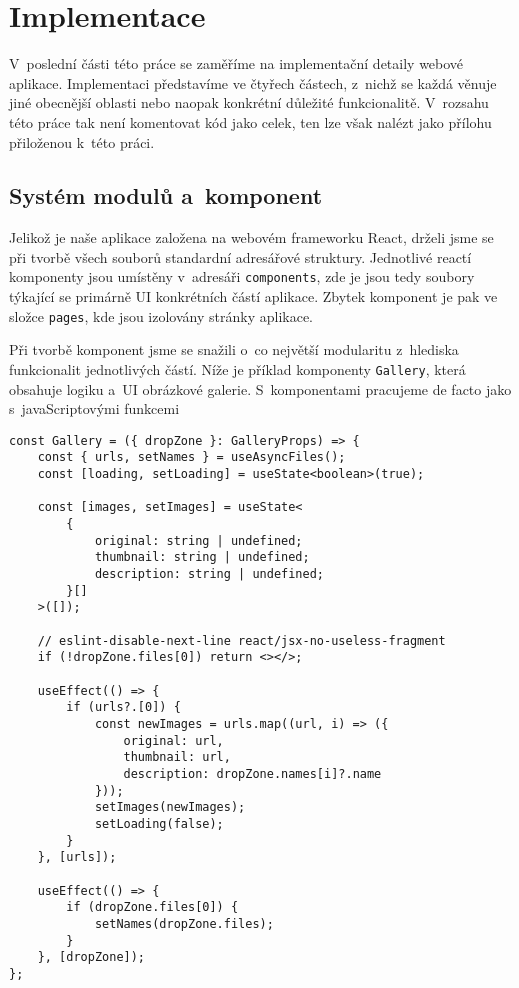 \hypertarget{implementace}{%
\chapter{Implementace}\label{implementace}}

V~poslední části této práce se zaměříme na implementační detaily webové aplikace. Implementaci představíme ve čtyřech částech, z~nichž se každá věnuje jiné obecnější oblasti nebo naopak konkrétní důležité funkcionalitě. V~rozsahu této práce tak není komentovat kód jako celek, ten lze však nalézt jako přílohu přiloženou k~této práci.

\hypertarget{systuxe9m-modulux16f-a-komponent}{%
\section{Systém modulů a~komponent}\label{systuxe9m-modulux16f-a-komponent}}

Jelikož je naše aplikace založena na webovém frameworku React, drželi jsme se při tvorbě všech souborů standardní adresářové struktury. Jednotlivé reactí komponenty jsou umístěny v~adresáři \verb|components|, zde je jsou tedy soubory týkající se primárně UI konkrétních částí aplikace. Zbytek komponent je pak ve složce \verb|pages|, kde jsou izolovány stránky aplikace.


Při tvorbě komponent jsme se snažili o~co největší modularitu z~hlediska funkcionalit jednotlivých částí. Níže je příklad komponenty \verb|Gallery|, která obsahuje logiku a~UI obrázkové galerie. S~komponentami pracujeme de facto jako s~javaScriptovými funkcemi

\begin{verbatim}
const Gallery = ({ dropZone }: GalleryProps) => {
    const { urls, setNames } = useAsyncFiles();
    const [loading, setLoading] = useState<boolean>(true);

    const [images, setImages] = useState<
        {
            original: string | undefined;
            thumbnail: string | undefined;
            description: string | undefined;
        }[]
    >([]);

    // eslint-disable-next-line react/jsx-no-useless-fragment
    if (!dropZone.files[0]) return <></>;

    useEffect(() => {
        if (urls?.[0]) {
            const newImages = urls.map((url, i) => ({
                original: url,
                thumbnail: url,
                description: dropZone.names[i]?.name
            }));
            setImages(newImages);
            setLoading(false);
        }
    }, [urls]);

    useEffect(() => {
        if (dropZone.files[0]) {
            setNames(dropZone.files);
        }
    }, [dropZone]);
};
\end{verbatim}

